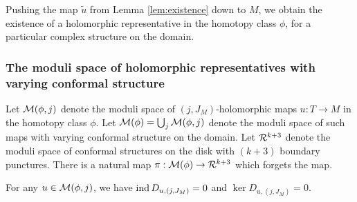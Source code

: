 \documentclass[12pt]{amsart}
\begin{document}


Pushing the map $\tilde{u}$ from Lemma \ref{lem:existence} down to
$M$, we obtain the existence of a holomorphic representative in the
homotopy class $\phi$, for a particular complex structure on the domain.

\subsubsection{The moduli space of holomorphic representatives with
  varying conformal structure}
\label{sec:moduli-space}

Let $\mathcal{M}(\phi,j)$ denote the moduli space of $(j,J_M)$-holomorphic
maps $u: T \to M$ in the homotopy class $\phi$. Let $\mathcal{M}(\phi) =
\bigcup_{j} \mathcal{M}(\phi,j)$ denote 
the moduli space of such maps with varying conformal structure on the
domain. Let $\mathcal{R}^{k+3}$ denote the moduli space of conformal
structures on the disk with $(k+3)$ boundary punctures. There is a
natural map $\pi: \mathcal{M}(\phi) \to \mathcal{R}^{k+3}$ which forgets the map.

\begin{lemma}
  \label{lem:no-kernel}
  For any $u \in \mathcal{M}(\phi,j)$, we have $\operatorname{ind} D_{u,(j,J_M)} = 0$ and $\ker D_{u,(j,J_M)} = 0$.
\end{lemma}
\end{document}
